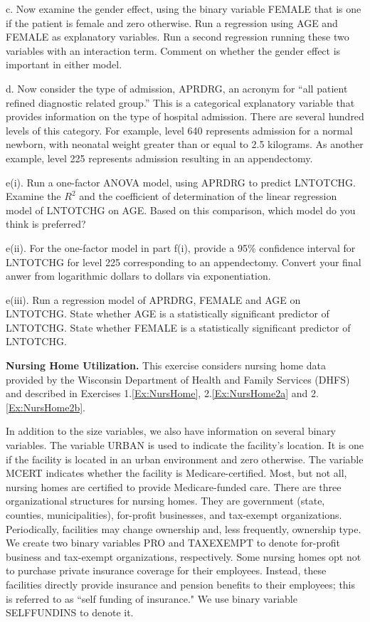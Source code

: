 \begin{exercises}
c. Now examine the gender effect, using the binary variable FEMALE
that is one if the patient is female and zero otherwise. Run a
regression using AGE and FEMALE as explanatory variables. Run a
second regression running these two variables with an interaction
term. Comment on whether the gender effect is important in either
model.

d. Now consider the type of admission, APRDRG, an acronym for ``all
patient refined diagnostic related group.'' This is a categorical
explanatory variable that provides information on the type of
hospital admission. There are several hundred levels of this
category. For example, level 640 represents admission for a normal
newborn, with neonatal weight greater than or equal to 2.5
kilograms. As another example, level 225 represents admission
resulting in an appendectomy.

e(i). Run a one-factor ANOVA model, using APRDRG to predict
LNTOTCHG. Examine the $R^2$ and the coefficient of determination of
the linear regression model of LNTOTCHG on AGE. Based on this
comparison, which model do you think is preferred?

e(ii). For the one-factor model in part f(i), provide a 95\%
confidence interval for LNTOTCHG for level 225 corresponding to an
appendectomy. Convert your final anwer from logarithmic dollars to
dollars via exponentiation.

e(iii). Run a regression model of APRDRG, FEMALE and AGE on
LNTOTCHG. State whether AGE is a statistically significant predictor
of LNTOTCHG. State whether FEMALE is a statistically significant
predictor of LNTOTCHG.


\item \textbf{Nursing Home Utilization.}\label{Ex:NursHome4} This exercise considers nursing
home data provided by the Wisconsin Department of Health and Family
Services (DHFS) and described in Exercises 1.\ref{Ex:NursHome},
2.\ref{Ex:NursHome2a} and 2.\ref{Ex:NursHome2b}.

In addition to the size variables, we also have information on
several binary variables. The variable URBAN is used to indicate the
facility's location. It is one if the facility is located in an
urban environment and zero otherwise. The variable MCERT indicates
whether the facility is Medicare-certified. Most, but not all,
nursing homes are certified to provide Medicare-funded care. There
are three organizational structures for nursing homes. They are
government (state, counties, municipalities), for-profit businesses,
and tax-exempt organizations. Periodically, facilities may change
ownership and, less frequently, ownership type. We create two binary
variables PRO and TAXEXEMPT to denote for-profit business and
tax-exempt organizations, respectively. Some nursing homes opt not
to purchase private insurance coverage for their employees. Instead,
these facilities directly provide insurance and pension benefits to
their employees; this is referred to as ``self funding of
insurance." We use binary variable SELFFUNDINS to denote it.


\end{exercises}
